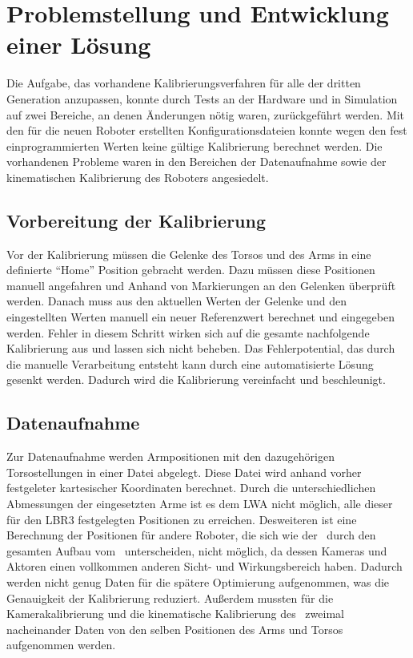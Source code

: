 \chapter{Problemstellung und Entwicklung einer Lösung}

Die Aufgabe, das vorhandene Kalibrierungsverfahren für alle \cob der dritten 
Generation anzupassen, konnte durch Tests an der Hardware und in Simulation 
auf zwei Bereiche, an denen Änderungen nötig waren, zurückgeführt werden. 
Mit den für die neuen Roboter erstellten Konfigurationsdateien konnte wegen
den fest einprogrammierten Werten keine gültige Kalibrierung berechnet werden.
Die vorhandenen Probleme waren in den Bereichen der Datenaufnahme
sowie der kinematischen Kalibrierung des Roboters angesiedelt. 

\section{Vorbereitung der Kalibrierung}
\label{sec:Vorbereitung der Kalibrierung}
Vor der Kalibrierung müssen die Gelenke des Torsos und des Arms in eine definierte
``Home'' Position gebracht werden. Dazu müssen diese Positionen manuell angefahren
und Anhand von Markierungen an den Gelenken überprüft werden. Danach muss aus 
den aktuellen Werten der Gelenke und den eingestellten Werten manuell ein neuer
Referenzwert berechnet und eingegeben werden. Fehler in diesem Schritt wirken 
sich auf die gesamte nachfolgende Kalibrierung aus und lassen sich nicht beheben.
Das Fehlerpotential, das durch die manuelle Verarbeitung entsteht kann durch 
eine automatisierte Lösung gesenkt werden. Dadurch wird die Kalibrierung 
vereinfacht und beschleunigt.
\section{Datenaufnahme} %

\label{sec:Datenaufnahme}


Zur Datenaufnahme
werden Armpositionen mit den dazugehörigen Torsostellungen in einer Datei 
abgelegt. Diese Datei wird anhand vorher festgeleter kartesischer Koordinaten
berechnet. Durch die unterschiedlichen Abmessungen der eingesetzten Arme 
ist es dem \ac{LWA} nicht möglich, alle dieser für den \ac{LBR3} festgelegten 
Positionen zu erreichen. Desweiteren ist eine Berechnung der Positionen
für andere Roboter, die sich wie der \raw\ durch den gesamten Aufbau vom 
\cob\ unterscheiden, nicht möglich, da dessen Kameras und Aktoren einen vollkommen
anderen Sicht- und Wirkungsbereich haben. Dadurch werden nicht genug Daten für die spätere 
Optimierung aufgenommen, was die Genauigkeit der Kalibrierung reduziert.
Außerdem mussten für die Kamerakalibrierung und die kinematische Kalibrierung 
des \cob\ zweimal nacheinander Daten von den selben Positionen des Arms und Torsos
aufgenommen werden.

